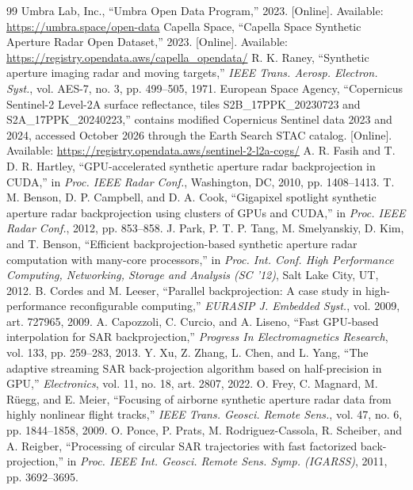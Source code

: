 \documentclass[11pt]{article}
\begin{document}
\begin{thebibliography}{99}
 Umbra Lab, Inc., ``Umbra Open Data Program,'' 2023. [Online]. Available: \url{https://umbra.space/open-data}
 Capella Space, ``Capella Space Synthetic Aperture Radar Open Dataset,'' 2023. [Online]. Available: \url{https://registry.opendata.aws/capella_opendata/}
 R. K. Raney, ``Synthetic aperture imaging radar and moving targets,'' \emph{IEEE Trans. Aerosp. Electron. Syst.}, vol. AES-7, no. 3, pp. 499--505, 1971.
 European Space Agency, ``Copernicus Sentinel-2 Level-2A surface reflectance, tiles S2B\_17PPK\_20230723 and S2A\_17PPK\_20240223,'' contains modified Copernicus Sentinel data 2023 and 2024, accessed October 2026 through the Earth Search STAC catalog. [Online]. Available: \url{https://registry.opendata.aws/sentinel-2-l2a-cogs/}
 A. R. Fasih and T. D. R. Hartley, ``GPU-accelerated synthetic aperture radar backprojection in CUDA,'' in \emph{Proc. IEEE Radar Conf.}, Washington, DC, 2010, pp. 1408--1413.
 T. M. Benson, D. P. Campbell, and D. A. Cook, ``Gigapixel spotlight synthetic aperture radar backprojection using clusters of GPUs and CUDA,'' in \emph{Proc. IEEE Radar Conf.}, 2012, pp. 853--858.
 J. Park, P. T. P. Tang, M. Smelyanskiy, D. Kim, and T. Benson, ``Efficient backprojection-based synthetic aperture radar computation with many-core processors,'' in \emph{Proc. Int. Conf. High Performance Computing, Networking, Storage and Analysis (SC '12)}, Salt Lake City, UT, 2012.
 B. Cordes and M. Leeser, ``Parallel backprojection: A case study in high-performance reconfigurable computing,'' \emph{EURASIP J. Embedded Syst.}, vol. 2009, art. 727965, 2009.
 A. Capozzoli, C. Curcio, and A. Liseno, ``Fast GPU-based interpolation for SAR backprojection,'' \emph{Progress In Electromagnetics Research}, vol. 133, pp. 259--283, 2013.
 Y. Xu, Z. Zhang, L. Chen, and L. Yang, ``The adaptive streaming SAR back-projection algorithm based on half-precision in GPU,'' \emph{Electronics}, vol. 11, no. 18, art. 2807, 2022.
 O. Frey, C. Magnard, M. R\"uegg, and E. Meier, ``Focusing of airborne synthetic aperture radar data from highly nonlinear flight tracks,'' \emph{IEEE Trans. Geosci. Remote Sens.}, vol. 47, no. 6, pp. 1844--1858, 2009.
 O. Ponce, P. Prats, M. Rodriguez-Cassola, R. Scheiber, and A. Reigber, ``Processing of circular SAR trajectories with fast factorized back-projection,'' in \emph{Proc. IEEE Int. Geosci. Remote Sens. Symp. (IGARSS)}, 2011, pp. 3692--3695.

\end{thebibliography}
\end{document}
